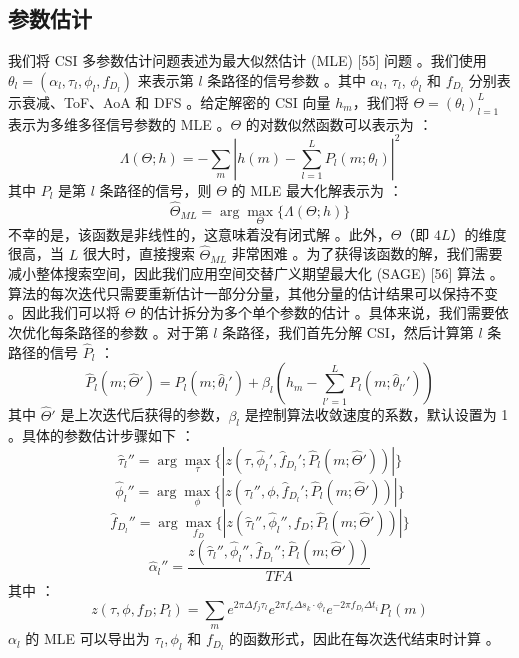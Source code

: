 \documentclass[journal]{IEEEtran}
\begin{document}
\subsection{参数估计}
我们将 CSI 多参数估计问题表述为最大似然估计 (MLE) [55] 问题 。我们使用 $\theta_{l}=(\alpha_{l},\tau_{l},\phi_{l},f_{D_{l}})$ 来表示第 $l$ 条路径的信号参数 。其中 $\alpha_{l}$, $\tau_{l}$, $\phi_{l}$ 和 $f_{D_{l}}$ 分别表示衰减、ToF、AoA 和 DFS 。给定解密的 CSI 向量 $h_{m}$，我们将 $\Theta=(\theta_{l})_{l=1}^{L}$ 表示为多维多径信号参数的 MLE 。$\Theta$ 的对数似然函数可以表示为 ：
\begin{equation}
\Lambda(\Theta;h)=-\sum_{m}|h(m)-\sum_{l=1}^{L}P_{l}(m;\theta_{l})|^{2}
\end{equation}
其中 $P_{l}$ 是第 $l$ 条路径的信号，则 $\Theta$ 的 MLE 最大化解表示为 ：
\begin{equation}
\hat{\Theta}_{ML}=\arg\max_{\Theta}\{\Lambda(\Theta;h)\}
\end{equation}
不幸的是，该函数是非线性的，这意味着没有闭式解 。此外，$\Theta$（即 $4L$）的维度很高，当 $L$ 很大时，直接搜索 $\hat{\Theta}_{ML}$ 非常困难 。为了获得该函数的解，我们需要减小整体搜索空间，因此我们应用空间交替广义期望最大化 (SAGE) [56] 算法 。算法的每次迭代只需要重新估计一部分分量，其他分量的估计结果可以保持不变 。因此我们可以将 $\Theta$ 的估计拆分为多个单个参数的估计 。具体来说，我们需要依次优化每条路径的参数 。对于第 $l$ 条路径，我们首先分解 CSI，然后计算第 $l$ 条路径的信号 $\hat{P}_{l}$ ：
\begin{equation}
\hat{P}_{l}(m;\hat{\Theta}')=P_{l}(m;\hat{\theta}_{l}')+\beta_{l}(h_{m}-\sum_{l'=1}^{L}P_{l}(m;\hat{\theta}_{l'}'))
\end{equation}
其中 $\hat{\Theta}'$ 是上次迭代后获得的参数，$\beta_{l}$ 是控制算法收敛速度的系数，默认设置为 1 。具体的参数估计步骤如下 ：
\begin{equation}
\hat{\tau}_{l}''=\arg\max_{\tau}\{|z(\tau,\hat{\phi}_{l}',\hat{f}_{D_{l}}';\hat{P}_{l}(m;\hat{\Theta}'))|\}
\end{equation}
\begin{equation}
\hat{\phi}_{l}''=\arg\max_{\phi}\{|z(\hat{\tau}_{l}'',\phi,\hat{f}_{D_{l}}';\hat{P}_{l}(m;\hat{\Theta}'))|\}
\end{equation}
\begin{equation}
\hat{f}_{D_{l}}''=\arg\max_{f_{D}}\{|z(\hat{\tau}_{l}'',\hat{\phi}_{l}'',f_{D};\hat{P}_{l}(m;\hat{\Theta}'))|\}
\end{equation}
\begin{equation}
\hat{\alpha}_{l}''=\frac{z(\hat{\tau}_{l}'',\hat{\phi}_{l}'',\hat{f}_{D_{l}}'';\hat{P}_{l}(m;\hat{\Theta}'))}{TFA}
\end{equation}
其中 ：
\begin{equation}
z(\tau,\phi,f_{D};P_{l})=\sum_{m}e^{2\pi\Delta f_{j}\tau_{l}}e^{2\pi f_{c}\Delta s_{k}\cdot\phi_{l}}e^{-2\pi f_{D_{l}}\Delta t_{i}}P_{l}(m)
\end{equation}
$\alpha_{l}$ 的 MLE 可以导出为 $\tau_{l}, \phi_{l}$ 和 $f_{D_{l}}$ 的函数形式，因此在每次迭代结束时计算 。
\end{document}
